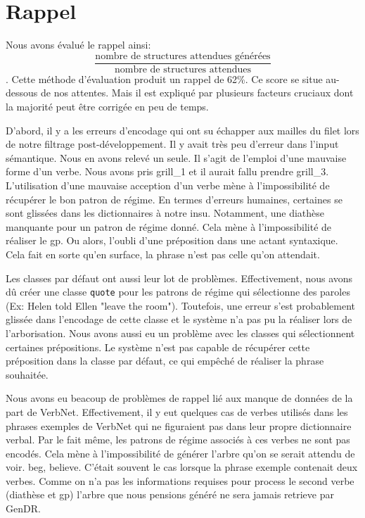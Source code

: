 \section{Rappel}

Nous avons évalué le rappel ainsi:\[\frac{\text{nombre de structures attendues générées}}{\text{nombre de structures attendues}}\]. Cette méthode d'évaluation produit un rappel de 62\%. Ce score se situe au-dessous de nos attentes. Mais il est expliqué par plusieurs facteurs cruciaux dont la majorité peut être corrigée en peu de temps. 

D'abord, il y a les erreurs d'encodage qui ont su échapper aux mailles du filet lors de notre filtrage post-développement. Il y avait très peu d'erreur dans l'input sémantique. Nous en avons relevé un seule. Il s'agit de l'emploi d'une mauvaise forme d'un verbe. Nous avons pris grill\_1 et il aurait fallu prendre grill\_3. L'utilisation d'une mauvaise acception d'un verbe mène à l'impossibilité de récupérer le bon patron de régime. En termes d'erreurs humaines, certaines se sont glissées dans les dictionnaires à notre insu. Notamment, une diathèse manquante pour un patron de régime donné. Cela mène à l'impossibilité de réaliser le gp. Ou alors, l'oubli d'une préposition dans une actant syntaxique. Cela fait en sorte qu'en surface, la phrase n'est pas celle qu'on attendait.

Les classes par défaut ont aussi leur lot de problèmes. Effectivement, nous avons dû créer une classe \texttt{quote} pour les patrons de régime qui sélectionne des paroles (Ex: Helen told Ellen "leave the room"). Toutefois, une erreur s'est probablement glissée dans l'encodage de cette classe et le système n'a pas pu la réaliser lors de l'arborisation. Nous avons aussi eu un problème avec les classes qui sélectionnent certaines prépositions. Le système n'est pas capable de récupérer cette préposition dans la classe par défaut, ce qui empêché de réaliser la phrase souhaitée. 

Nous avons eu beacoup de problèmes de rappel lié aux manque de données de la part de VerbNet. Effectivement, il y eut quelques cas de verbes utilisés dans les phrases exemples de VerbNet qui ne figuraient pas dans leur propre dictionnaire verbal. Par le fait même, les patrons de régime associés à ces verbes ne sont pas encodés. Cela mène à l'impossibilité de générer l'arbre qu'on se serait attendu de voir. beg, believe. C'était souvent le cas lorsque la phrase exemple contenait deux verbes. Comme on n'a pas les informations requises pour process le second verbe (diathèse et gp) l'arbre que nous pensions généré ne sera jamais retrieve par GenDR. 

